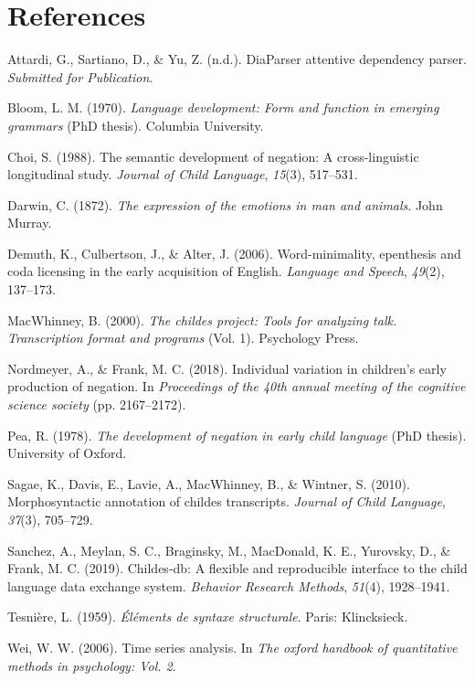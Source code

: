 \documentclass[10pt, letterpaper]{article}
\begin{document}
\hypertarget{references}{%
\section{References}\label{references}}

\setlength{\parindent}{-0.1in} 
\setlength{\leftskip}{0.125in}

\noindent

\hypertarget{refs}{}
\leavevmode\hypertarget{ref-diaparser}{}%
Attardi, G., Sartiano, D., \& Yu, Z. (n.d.). DiaParser attentive
dependency parser. \emph{Submitted for Publication}.

\leavevmode\hypertarget{ref-bloom1970language}{}%
Bloom, L. M. (1970). \emph{Language development: Form and function in
emerging grammars} (PhD thesis). Columbia University.

\leavevmode\hypertarget{ref-choi1988semantic}{}%
Choi, S. (1988). The semantic development of negation: A
cross-linguistic longitudinal study. \emph{Journal of Child Language},
\emph{15}(3), 517--531.

\leavevmode\hypertarget{ref-darwin1872expression}{}%
Darwin, C. (1872). \emph{The expression of the emotions in man and
animals}. John Murray.

\leavevmode\hypertarget{ref-demuth2006word}{}%
Demuth, K., Culbertson, J., \& Alter, J. (2006). Word-minimality,
epenthesis and coda licensing in the early acquisition of English.
\emph{Language and Speech}, \emph{49}(2), 137--173.

\leavevmode\hypertarget{ref-macwhinney2000childes}{}%
MacWhinney, B. (2000). \emph{The childes project: Tools for analyzing
talk. Transcription format and programs} (Vol. 1). Psychology Press.

\leavevmode\hypertarget{ref-nordmeyer2018individual}{}%
Nordmeyer, A., \& Frank, M. C. (2018). Individual variation in
children's early production of negation. In \emph{Proceedings of the
40th annual meeting of the cognitive science society} (pp. 2167--2172).

\leavevmode\hypertarget{ref-pea1978}{}%
Pea, R. (1978). \emph{The development of negation in early child
language} (PhD thesis). University of Oxford.

\leavevmode\hypertarget{ref-sagae2010morphosyntactic}{}%
Sagae, K., Davis, E., Lavie, A., MacWhinney, B., \& Wintner, S. (2010).
Morphosyntactic annotation of childes transcripts. \emph{Journal of
Child Language}, \emph{37}(3), 705--729.

\leavevmode\hypertarget{ref-sanchez2019childes}{}%
Sanchez, A., Meylan, S. C., Braginsky, M., MacDonald, K. E., Yurovsky,
D., \& Frank, M. C. (2019). Childes-db: A flexible and reproducible
interface to the child language data exchange system. \emph{Behavior
Research Methods}, \emph{51}(4), 1928--1941.

\leavevmode\hypertarget{ref-dg}{}%
Tesnière, L. (1959). \emph{Éléments de syntaxe structurale}. Paris:
Klincksieck.

\leavevmode\hypertarget{ref-wei2006time}{}%
Wei, W. W. (2006). Time series analysis. In \emph{The oxford handbook of
quantitative methods in psychology: Vol. 2}.


\end{document}
